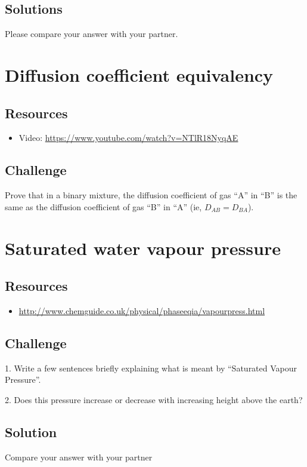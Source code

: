 \subsection*{Solutions}
Please compare your answer with your partner.




\newpage
\section{Diffusion coefficient equivalency}

\subsection*{Resources}
\begin{itemize}
    \item Video: \url{https://www.youtube.com/watch?v=NTlR18NyqAE}
\end{itemize}

\subsection*{Challenge}
Prove that in a binary mixture, the diffusion coefficient of gas ``A'' in ``B'' is the same as the diffusion coefficient of gas ``B'' in ``A'' (ie, $D_{AB} = D_{BA}$).




\newpage
\section{Saturated water vapour pressure}

\subsection*{Resources}
\begin{itemize}
    \item \url{http://www.chemguide.co.uk/physical/phaseeqia/vapourpress.html}
\end{itemize}

\subsection*{Challenge}
1. Write a few sentences briefly explaining what is meant by ``Saturated Vapour Pressure''.

2. Does this pressure increase or decrease with increasing height above the earth?

\subsection*{Solution}
Compare your answer with your partner




